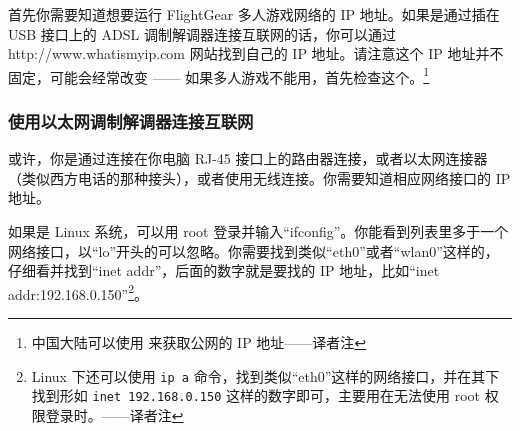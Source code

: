 首先你需要知道想要运行 FlightGear 多人游戏网络的 IP 地址。如果是通过插在 USB 接口上的 ADSL 调制解调器连接互联网的话，你可以通过 http://www.whatismyip.com 网站找到自己的 IP 地址。请注意这个 IP 地址并不固定，可能会经常改变 —— 如果多人游戏不能用，首先检查这个。\footnote{中国大陆可以使用  来获取公网的 IP 地址——译者注}
\fi
\iffalse
\IfLanguageName{english}{
\subsubsection{Those using a USB modem to connect to the Internet}

First of all, you need to know the IP address of the network interface you're going to be running FG multiplayer over.
If your Internet connection is via an ADSL modem that plugs directly into your computer with a USB connection, you
should be able to find your IP address by visiting http://www.whatismyip.com . Please note that this address may very well
change every now and again - if MP stops working, check this first.
}{}
\fi
{}

\ifchinese
\subsubsection{使用以太网调制解调器连接互联网}

或许，你是通过连接在你电脑 RJ-45 接口上的路由器连接，或者以太网连接器（类似西方电话的那种接头），或者使用无线连接。你需要知道相应网络接口的 IP 地址。

如果是 Linux 系统，可以用 root 登录并输入“ifconfig”。你能看到列表里多于一个网络接口，以“lo”开头的可以忽略。你需要找到类似“eth0”或者“wlan0”这样的，仔细看并找到“inet addr”，后面的数字就是要找的 IP 地址，比如“inet addr:192.168.0.150”\footnote{Linux 下还可以使用 \texttt{ip a} 命令，找到类似“eth0”这样的网络接口，并在其下找到形如 \texttt{inet 192.168.0.150} 这样的数字即可，主要用在无法使用 root 权限登录时。——译者注}。

